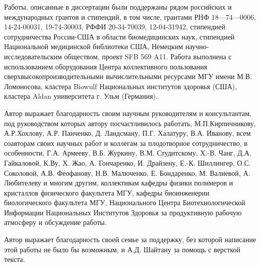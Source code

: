 
Работы, описанные в диссертации были поддержаны рядом российских и международных грантов и стипендий, в том числе, грантами РНФ 18—74—0006, 14-24-00031, 19-74-30003, РФФИ 20-34-70039, 12-04-31942, стипендией сотрудничества России-США в области биомедицинских наук, стипендией Национальной медицинской библиотеки США, Немецким научно-исследовательским обществом, проект SFB 569 A11. Работа выполнена с использованием оборудования Центра коллективного пользования сверхвысокопроизводительными вычислительными ресурсами МГУ имени М.В. Ломоносова, кластера Biowulf Национальных институтов здоровья (США), кластера Aldan университета г. Ульм (Германия).

Автор выражает благодарность своим научным руководителям и консультантам, под руководством которых автору посчастливилось работать, М.П.Кирпичникову, А.Р.Хохлову, А.Р. Панченко, Д. Ландсману, П.Г. Халатуру, В.А. Иванову, всем соавторам своих научных работ и коллегам за плодотворное сотрудничество, в особенности, Г.А. Армееву, В.Б. Журкину, В.М. Студитскому, Х.-В. Чанг, Д.А. Гайкаловой, К.Ву, Х. Жао, А. Гончаренко, И. Драйзену, Е.-К. Шиллингер, О.С. Соколовой, А.В. Феофанову, Н.В. Малюченко, Е. Бондаренко, М. Валиевой, А. Любителеву и многим другим, коллективам кафедры физики полимеров и кристаллов физического факультета МГУ, кафедры биоинженерии биологического факультета МГУ, Национального Центра Биотехнологической Информации Национальных Институтов Здоровья за продуктивную рабочую атмосферу и обсуждение работы.

Автор выражает благодарность своей семье за поддержку, без которой написание этой работы не было бы возможным, и А.Д. Шайтану за помощь с версткой текста.
